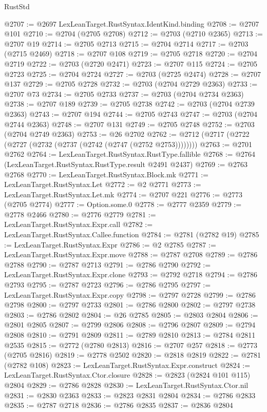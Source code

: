\begin{lexlean}{RustStd}
\begin{coremodule}
@2707 := @2697 LexLeanTarget.RustSyntax.IdentKind.binding
@2708 := @2707 @101
@2710 := @2704 (@2705 @2708)
@2712 := @2703 (@2710 @2365)
@2713 := @2707 @19
@2714 := @2705 @2713
@2715 := @2704 @2714
@2717 := @2703 (@2715 @2469)
@2718 := @2707 @108
@2719 := @2705 @2718
@2720 := @2704 @2719
@2722 := @2703 (@2720 @2471)
@2723 := @2707 @115
@2724 := @2705 @2723
@2725 := @2704 @2724
@2727 := @2703 (@2725 @2474)
@2728 := @2707 @137
@2729 := @2705 @2728
@2732 := @2703 (@2704 @2729 @2363)
@2733 := @2707 @73
@2734 := @2705 @2733
@2737 := @2703 (@2704 @2734 @2363)
@2738 := @2707 @189
@2739 := @2705 @2738
@2742 := @2703 (@2704 @2739 @2363)
@2743 := @2707 @194
@2744 := @2705 @2743
@2747 := @2703 (@2704 @2744 @2363)
@2748 := @2707 @131
@2749 := @2705 @2748
@2752 := @2703 (@2704 @2749 @2363)
@2753 := @26 @2702
@2762 := @2712 (@2717 (@2722 (@2727 (@2732 (@2737 (@2742 (@2747 (@2752 @2753))))))))
@2763 := @2701 @2762
@2764 := LexLeanTarget.RustSyntax.RustType.fallible
@2768 := @2764 (LexLeanTarget.RustSyntax.RustType.result @2491 @2437)
@2769 := @2763 @2768
@2770 := LexLeanTarget.RustSyntax.Block.mk
@2771 := LexLeanTarget.RustSyntax.Let
@2772 := @2 @2771
@2773 := LexLeanTarget.RustSyntax.Let.mk
@2774 := @2707 @221
@2776 := @2773 (@2705 @2774)
@2777 := Option.some.{0}
@2778 := @2777 @2359
@2779 := @2778 @2466
@2780 := @2776 @2779
@2781 := LexLeanTarget.RustSyntax.Expr.call
@2782 := LexLeanTarget.RustSyntax.Callee.function
@2784 := @2781 (@2782 @19)
@2785 := LexLeanTarget.RustSyntax.Expr
@2786 := @2 @2785
@2787 := LexLeanTarget.RustSyntax.Expr.move
@2788 := @2787 @2708
@2789 := @2786 @2788
@2790 := @2787 @2713
@2791 := @2786 @2790
@2792 := LexLeanTarget.RustSyntax.Expr.clone
@2793 := @2792 @2718
@2794 := @2786 @2793
@2795 := @2787 @2723
@2796 := @2786 @2795
@2797 := LexLeanTarget.RustSyntax.Expr.copy
@2798 := @2797 @2728
@2799 := @2786 @2798
@2800 := @2797 @2733
@2801 := @2786 @2800
@2802 := @2797 @2738
@2803 := @2786 @2802
@2804 := @26 @2785
@2805 := @2803 @2804
@2806 := @2801 @2805
@2807 := @2799 @2806
@2808 := @2796 @2807
@2809 := @2794 @2808
@2810 := @2791 @2809
@2811 := @2789 @2810
@2813 := @2784 @2811 @2535
@2815 := @2772 (@2780 @2813)
@2816 := @2707 @257
@2818 := @2773 (@2705 @2816)
@2819 := @2778 @2502
@2820 := @2818 @2819
@2822 := @2781 (@2782 @108)
@2823 := LexLeanTarget.RustSyntax.Expr.construct
@2824 := LexLeanTarget.RustSyntax.Ctor.closure
@2828 := @2823 (@2824 @101 @115) @2804
@2829 := @2786 @2828
@2830 := LexLeanTarget.RustSyntax.Ctor.nil
@2831 := @2830 @2363
@2833 := @2823 @2831 @2804
@2834 := @2786 @2833
@2835 := @2787 @2718
@2836 := @2786 @2835
@2837 := @2836 @2804

\end{coremodule}
\end{lexlean}

